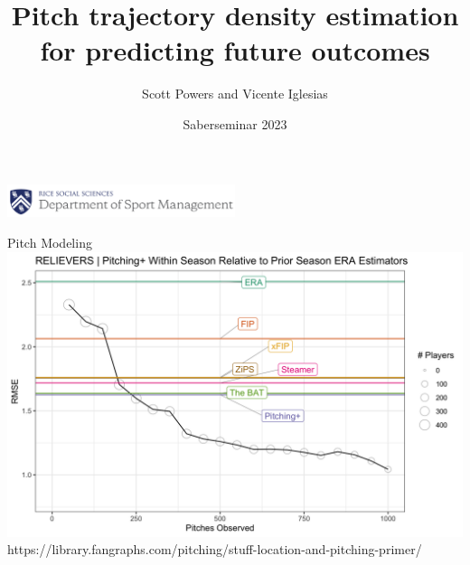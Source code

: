 \documentclass{beamer}
\title{Pitch trajectory density estimation \\ for predicting future outcomes}
\author{\color{ricerichblue} Scott Powers and Vicente Iglesias}
\date{Saberseminar 2023}
\begin{document}
  \begin{frame}
    \maketitle
    \vfill
    \hfill
    \includegraphics[width = 0.5\textwidth]{images/rice_smgt.png}
  \end{frame}

  \begin{frame}{Pitch Modeling}
    \centering
    \includegraphics[width = \textwidth]{images/pitching_plus.png}\\
    \color{ricegray} \scriptsize https://library.fangraphs.com/pitching/stuff-location-and-pitching-primer/
  \end{frame}
\end{document}

